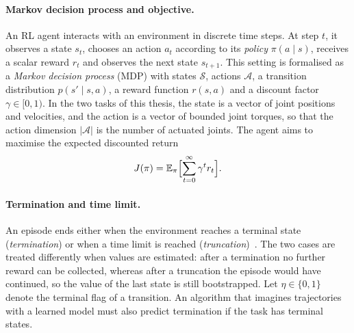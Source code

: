 \paragraph{Markov decision process and objective.} An RL agent interacts with an environment in discrete time steps.
At step $t$, it observes a state $s_t$, chooses an action $a_t$ according to its \emph{policy} $\pi(a \mid s)$, receives a scalar reward $r_t$ and observes the next state $s_{t+1}$.
This setting is formalised as a \emph{Markov decision process} (MDP) with states $\mathcal{S}$, actions $\mathcal{A}$, a transition distribution $p(s' \mid s, a)$, a reward function $r(s,a)$ and a discount factor $\gamma \in [0,1)$.
In the two tasks of this thesis, the state is a vector of joint positions and velocities, and the action is a vector of bounded joint torques, so that the action dimension $|\mathcal{A}|$ is the number of actuated joints.
The agent aims to maximise the expected discounted return
\begin{equation}
  J(\pi) = \mathbb{E}_{\pi}\Bigl[\sum_{t=0}^{\infty} \gamma^{t} r_t\Bigr] .
  \label{eq:bg-return}
\end{equation}

\paragraph{Termination and time limit.} An episode ends either when the environment reaches a terminal state (\emph{termination}) or when a time limit is reached (\emph{truncation})~\cite{towers2024gymnasium}.
The two cases are treated differently when values are estimated: after a termination no further reward can be collected, whereas after a truncation the episode would have continued, so the value of the last state is still bootstrapped.
Let $\eta \in \{0,1\}$ denote the terminal flag of a transition.
An algorithm that imagines trajectories with a learned model must also predict termination if the task has terminal states.

